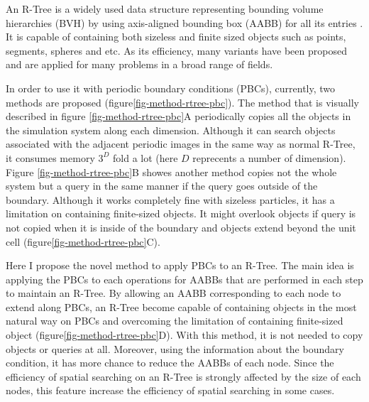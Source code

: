 \documentclass[10pt,letterpaper,twocolumn]{article}
\begin{document}
An R-Tree is a widely used data structure representing bounding volume
hierarchies (BVH) by using axis-aligned bounding box (AABB) for all its entries
\cite{Guttman1984}. It is capable of containing both sizeless and finite sized
objects such as points, segments, spheres and etc. As its efficiency, many
variants have been proposed and are applied for many problems in a broad range
of fields.

In order to use it with periodic boundary conditions (PBCs), currently,
two methods are proposed (figure\ref{fig-method-rtree-pbc})\cite{CoSTR-R-tree2016}.
The method that is visually described in figure \ref{fig-method-rtree-pbc}A
periodically copies all the objects in the simulation system along each dimension.
Although it can search objects associated with the adjacent periodic images in
the same way as normal R-Tree, it consumes memory $3^D$ fold a lot (here $D$
reprecents a number of dimension).
Figure \ref{fig-method-rtree-pbc}B showes another method copies not the whole
system but a query in the same manner if the query goes outside of the boundary.
Although it works completely fine with sizeless particles, it has a limitation on
containing finite-sized objects. It might overlook objects if query is not copied
when it is inside of the boundary and objects extend beyond the unit cell
(figure\ref{fig-method-rtree-pbc}C).

Here I propose the novel method to apply PBCs to an R-Tree. The main idea is
applying the PBCs to each operations for AABBs that are performed in each step
to maintain an R-Tree. By allowing an AABB corresponding to each node to extend
along PBCs, an R-Tree become capable of containing objects in the most natural
way on PBCs and overcoming the limitation of containing finite-sized object
(figure\ref{fig-method-rtree-pbc}D).
With this method, it is not needed to copy objects or queries at all.
Moreover, using the information about the boundary condition, it has more chance
to reduce the AABBs of each node. Since the efficiency of spatial searching on
an R-Tree is strongly affected by the size of each nodes, this feature increase
the efficiency of spatial searching in some cases.
\end{document}
